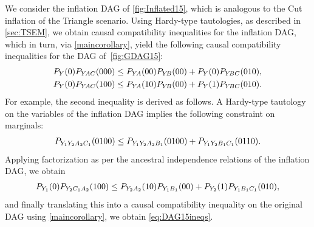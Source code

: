 \documentclass[aps,english,superscriptaddress,onecolumn,twoside,longbibliography,pra,floatfix,fleqn,nofootinbib]{revtex4-1}%
\theoremstyle{definition}
\newcounter{example}[section]
\newcommand{\p}[2][]{{P_{#1}}\parenths{#2}}
\DeclarePairedDelimiter{\parenths}{\lparen}{\rparen}
\begin{document}
We consider the inflation DAG of \cref{fig:Inflated15}, which is analogous to the Cut inflation of the Triangle scenario.   Using Hardy-type tautologies, as described in \cref{sec:TSEM}, we obtain causal compatibility inequalities for the inflation DAG, which in turn, via \cref{maincorollary}, yield the following causal compatibility inequalities for the DAG of~\cref{fig:GDAG15}:
\begin{align}
\p[Y]{0} \p[Y\! A C]{0 0 0} \leq {\p[Y\! A]{0 0} \p[Y\! B]{0 0}  + \p[Y]{0} \p[Y\! B C]{0 1 0}}, \\
\p[Y]{0}\p[Y\! A C]{1 0 0} \leq {\p[Y\! A]{1 0} \p[Y\! B]{0 0} + \p[Y]{1} \p[Y\! B C]{0 1 0}}.
\label{eq:DAG15ineqs}
\end{align}
For example, the second inequality is derived as follows. A Hardy-type tautology on the variables of the inflation DAG implies the following constraint on marginals:
\begin{align}\label{eq:hardyforpienaar}
     \p[Y_1 Y_2 A_2 C_1]{0100} \leq \p[Y_1 Y_2 A_2 B_1]{0100} + \p[Y_1 Y_2 B_1 C_1 ]{0110} .
\end{align}
Applying factorization as per the ancestral independence relations of the inflation DAG, we obtain 
\begin{align}
 \p[Y_1]{0} \p[Y_2 C_1 A_2]{100} \leq \p[Y_2 A_2]{10} \p[Y_1 B_1]{00} + \p[Y_2]{1} \p[Y_1 B_1 C_1]{010}, 
\end{align}
and finally translating this into a causal compatibility inequality on the original DAG using \cref{maincorollary}, we obtain \cref{eq:DAG15ineqs}. 
 
\end{document}
